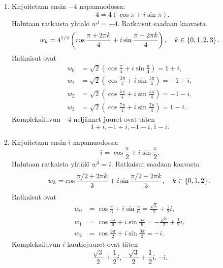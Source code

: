 \documentclass[11pt,a4paper]{amsart}
\begin{document}
\begin{solution}
\leavevmode\par
\begin{enumerate}[label=\alph*), nosep]
\item Kirjoitetaan ensin \(-4\) napamuodossa:
\[
-4 = 4(\cos\pi + i\sin\pi).
\]
\newpage
Halutaan ratkaista yhtälö \(w^4 = -4\). Ratkaisut saadaan kaavasta
\[
w_k = 4^{1/4}\left(\cos{\frac{\pi + 2\pi k}{4}} + i\sin{\frac{\pi +
2\pi k}{4}}\right), \quad k \in \left\lbrace0, 1, 2, 3\right\rbrace.
\]
Ratkaisut ovat
\[
\begin{aligned}
w_0 &= \sqrt{2}\left(\cos{\frac{\pi}{4}} +
i\sin{\frac{\pi}{4}}\right) = 1 + i, \\
w_1 &= \sqrt{2}\left(\cos{\frac{3\pi}{4}} +
i\sin{\frac{3\pi}{4}}\right) = -1 + i, \\
w_2 &= \sqrt{2}\left(\cos{\frac{5\pi}{4}} +
i\sin{\frac{5\pi}{4}}\right) = -1 - i, \\
w_3 &= \sqrt{2}\left(\cos{\frac{7\pi}{4}} +
i\sin{\frac{7\pi}{4}}\right) = 1 - i.
\end{aligned}
\]
Kompleksiluvun \(-4\) neljännet juuret ovat täten
\[
1 + i, -1 + i, -1 - i, 1 - i.
\]
\item Kirjoitetaan ensin \(i\) napamuodossa:
\[
i = \cos\frac{\pi}{2} + i\sin\frac{\pi}{2}.
\]
Halutaan ratkaista yhtälö \(w^3 = i\). Ratkaisut saadaan kaavasta
\[
w_k = \cos{\frac{\pi/2 + 2\pi k}{3}} + i\sin{\frac{\pi/2 + 2\pi
k}{3}}, \quad k \in \left\lbrace0, 1, 2\right\rbrace.
\]
Ratkaisut ovat
\[
\begin{aligned}
w_0 &= \cos{\frac{\pi}{6}} + i\sin{\frac{\pi}{6}} = \frac{\sqrt{3}}{2}
+ \frac{1}{2}i, \\
w_1 &= \cos{\frac{5\pi}{6}} + i\sin{\frac{5\pi}{6}} = -\frac{\sqrt{3}}{2}
+ \frac{1}{2}i, \\
w_2 &= \cos{\frac{3\pi}{2}} + i\sin{\frac{3\pi}{2}} = -i.
\end{aligned}
\]
Kompleksiluvun \(i\) kuutiojuuret ovat täten
\[
\frac{\sqrt{3}}{2} + \frac{1}{2}i, -\frac{\sqrt{3}}{2} + \frac{1}{2}i, -i.
\]
\end{enumerate}


\end{solution}
\end{document}
